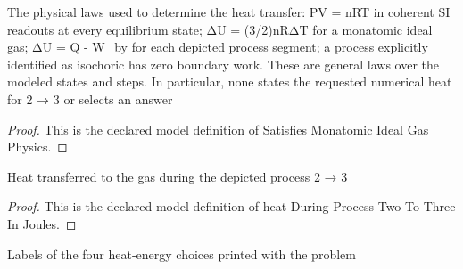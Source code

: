 \begin{definition}
  \label{def:physics:phyx-mini-0411:phyxminiproblems-problemphyxmini0411-satisfiesmonatomicidealgasphysics}
  The physical laws used to determine the heat transfer: PV = nRT in coherent SI readouts at every equilibrium state; ΔU = (3/2)nRΔT for a monatomic ideal gas; ΔU = Q - W\_by for each depicted process segment; a process explicitly identified as isochoric has zero boundary work. These are general laws over the modeled states and steps. In particular, none states the requested numerical heat for 2 → 3 or selects an answer
\end{definition}
\begin{proof}
  This is the declared model definition of Satisfies Monatomic Ideal Gas Physics.
\end{proof}
\begin{definition}
  \label{def:physics:phyx-mini-0411:phyxminiproblems-problemphyxmini0411-heatduringprocesstwotothreeinjoules}
  Heat transferred to the gas during the depicted process 2 → 3
\end{definition}
\begin{proof}
  This is the declared model definition of heat During Process Two To Three In Joules.
\end{proof}
\begin{definition}
  \label{def:physics:phyx-mini-0411:phyxminiproblems-problemphyxmini0411-answerchoice}
  Labels of the four heat-energy choices printed with the problem
\end{definition}

